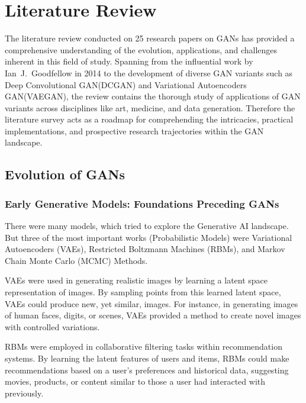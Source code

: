 \chapter{Literature Review}

\setcounter{equation}{0}

\noindent
The literature review conducted on 25 research papers on GANs has provided a comprehensive understanding of the evolution, applications, and challenges inherent in this field of study. Spanning from the influential work by \mbox{Ian J. Goodfellow} in 2014 to the development of diverse GAN variants such as Deep Convolutional GAN(DCGAN) and Variational Autoencoders GAN(VAEGAN), the review contains the thorough study of applications of GAN variants across disciplines like art, medicine, and data generation. Therefore the literature survey acts as a roadmap for comprehending the intricacies, practical implementations, and prospective research trajectories within the GAN landscape.


\section{Evolution of GANs}

\subsection{Early Generative Models: Foundations Preceding GANs}

There were many models, which tried to explore the Generative AI landscape. But three of the most important works (Probabilistic Models) were Variational Autoencoders (VAEs)\cite{VAE}, Restricted Boltzmann Machines (RBMs)\cite{RBM}, and Markov Chain Monte Carlo (MCMC)\cite{MCMC} Methods.

\noindent
VAEs were used in generating realistic images by learning a latent space representation of images. By sampling points from this learned latent space, VAEs could produce new, yet similar, images. For instance, in generating images of human faces, digits, or scenes, VAEs provided a method to create novel images with controlled variations.

\clearpage

\noindent
RBMs were employed in collaborative filtering tasks within recommendation systems. By learning the latent features of users and items, RBMs could make recommendations based on a user's preferences and historical data, suggesting movies, products, or content similar to those a user had interacted with previously.

